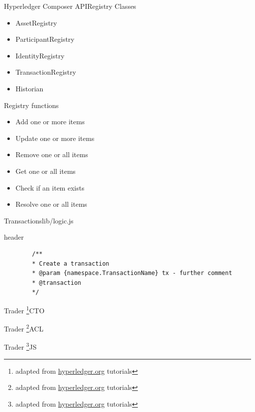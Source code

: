 \documentclass[pdf,table]{beamer}
\begin{document}
\begin{frame}{Hyperledger Composer API}{Registry Classes}
	\begin{itemize}
		\item AssetRegistry
		\item ParticipantRegistry
		\item IdentityRegistry
		\item TransactionRegistry
		\item Historian
	\end{itemize}
\end{frame}

\begin{frame}{Registry functions}
	\begin{itemize}
		\item Add one or more items
		\item Update one or more items 
		\item Remove one or all items
		\item Get one or all items
		\item Check if an item exists
		\item Resolve one or all items
	\end{itemize}
\end{frame}

\begin{frame}[fragile]{Transactions}{lib/logic.js}
	\begin{block}{header}
	\begin{verbatim}
		/**
		* Create a transaction 
		* @param {namespace.TransactionName} tx - further comment
		* @transaction
		*/
		\end{verbatim}
	\end{block}
\end{frame}

\begin{frame}{Trader \footnote{adapted from \url{hyperledger.org} tutorials}}{CTO}
	
\end{frame}

\begin{frame}{Trader \footnote{adapted from \url{hyperledger.org} tutorials}}{ACL}
	
\end{frame}

\begin{frame}{Trader \footnote{adapted from \url{hyperledger.org} tutorials}}{JS}
	
\end{frame}
\end{document}
